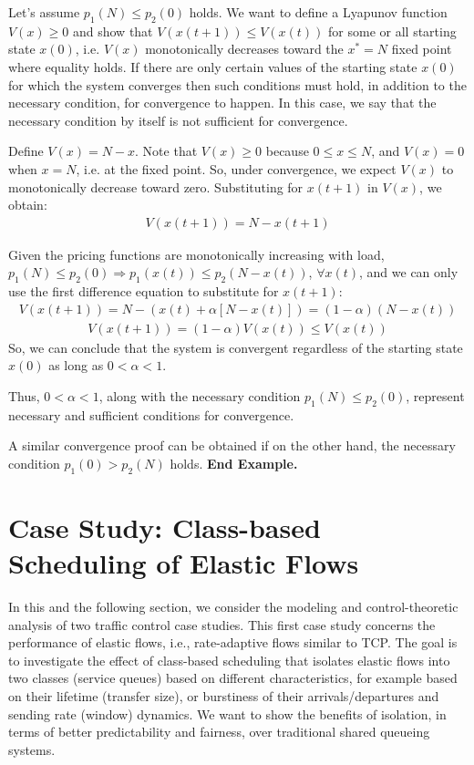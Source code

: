 \documentclass{article}
\begin{document}
Let's assume $p_1(N) \leq p_2(0)$ holds. We want to define a Lyapunov function $V(x) \geq 0$ and show that
$V(x(t+1)) \leq V(x(t))$ for some or all starting state $x(0)$, 
i.e. $V(x)$ monotonically decreases toward the $x^* = N$ fixed point
where equality holds.
If there are only certain values of the starting state $x(0)$ for which the system converges then
such conditions must hold, in addition to the necessary condition,
for convergence to happen. 
In this case, we say that the necessary condition by itself is not sufficient for convergence.

Define $V(x) = N - x$. Note that $V(x) \geq 0$ because $0 \leq x \leq N$, and $V(x) = 0$ when $x = N$, i.e. at the fixed point. 
So, under convergence, we expect $V(x)$ to monotonically decrease toward zero. 
Substituting for $x(t+1)$ in $V(x)$, we obtain:
\begin{eqnarray*}
V(x(t+1)) = N - x(t+1) 
\end{eqnarray*}

Given the pricing functions are monotonically increasing with load,
$p_1(N) \leq p_2(0) \Rightarrow p_1(x(t)) \leq p_2(N -  x(t))$, $\forall x(t)$, 
and we can only use the first difference equation to substitute for $x(t+1)$:
\begin{eqnarray*}
V(x(t+1)) = N - (x(t) + \alpha [N - x(t)]) = (1 - \alpha)(N - x(t)) 
\end{eqnarray*}
\begin{eqnarray*}
V(x(t+1)) =   (1 - \alpha) V(x(t)) \leq V(x(t))
\end{eqnarray*}
So, we can conclude that the system is convergent regardless of the starting state $x(0)$ as long as $0 < \alpha < 1$.

Thus, $0 < \alpha < 1$, along with the necessary condition $p_1(N) \leq p_2(0)$,
represent necessary and sufficient conditions for convergence.

A similar convergence proof can be obtained if on the other hand, the necessary condition $p_1(0) > p_2(N)$ holds.
{\bf End Example.}

\section{Case Study: Class-based Scheduling of Elastic Flows}
\label{sec:case1}

In this and the following section, 
we consider the modeling and control-theoretic analysis of two traffic control case studies. 
This first case study \cite{MattaGuo:icnp00,GuoMatta:icnp01} 
concerns the performance of elastic  flows, i.e., rate-adaptive flows similar to TCP.
The goal is to investigate the effect of class-based scheduling
that isolates elastic flows into two classes (service queues) based on different characteristics,
for example based on their lifetime (transfer size), 
or burstiness of their arrivals/departures and
sending rate (window) dynamics.
We want to show the benefits of isolation,
in terms of better predictability and fairness,
over traditional shared queueing systems.
\end{document}
